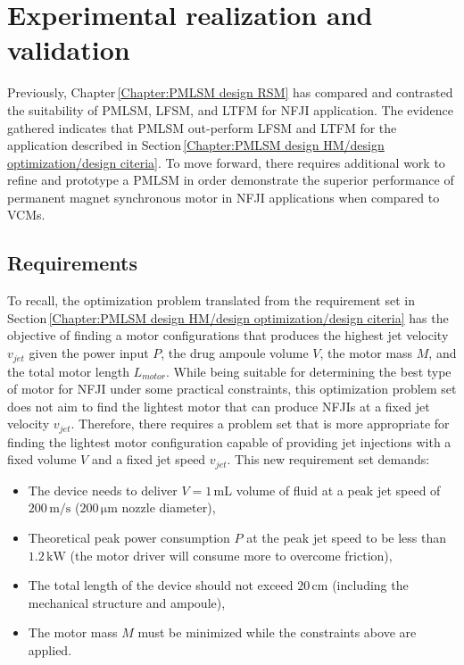 \chapter{Experimental realization and validation}   \label{Chapter:experiment}
    
    
    Previously, Chapter\,\ref{Chapter:PMLSM design RSM} has compared and contrasted the suitability of \acf{PMLSM}, \acf{LFSM}, and \acf{LTFM} for \acf{NFJI} application. The evidence gathered indicates that \acs{PMLSM} out-perform \acs{LFSM} and \acs{LTFM} for the application described in Section\,\ref{Chapter:PMLSM design HM/design optimization/design citeria}. To move forward, there requires additional work to refine and prototype a \acs{PMLSM} in order demonstrate the superior performance of permanent magnet synchronous motor in \acs{NFJI} applications when compared to \acfp{VCM}.  
    
    
\section{Requirements}                              \label{Chapter:experiment/requirements}
    
    To recall, the optimization problem translated from the requirement set in Section\,\ref{Chapter:PMLSM design HM/design optimization/design citeria} has the objective of finding a motor configurations that produces the highest jet velocity $v_{jet}$ given the power input $P$, the drug ampoule volume $V$, the motor mass $M$, and the total motor length $L_{motor}$. While being suitable for determining the best type of motor for \acs{NFJI} under some practical constraints, this optimization problem set does not aim to find the lightest motor that can produce \acsp{NFJI} at a fixed jet velocity $v_{jet}$. Therefore, there requires a problem set that is more appropriate for finding the lightest motor configuration capable of providing jet injections with a fixed volume $V$ and a fixed jet speed $v_{jet}$. This new requirement set demands:
    
    
    \begin{itemize}
        \item The device needs to deliver $V = 1\,\mathrm{mL}$ volume of fluid at a peak jet speed of $200\,\mathrm m/\mathrm s$ ($200\,\mathrm{\mu m}$ nozzle diameter),
        \item Theoretical peak power consumption $P$ at the peak jet speed to be less than $1.2\,\mathrm{kW}$ (the motor driver will consume more to overcome friction),
        \item The total length of the device should not exceed $20\,\mathrm{cm}$  (including the mechanical structure and ampoule),
        \item The motor mass $M$ must be minimized while the constraints above are applied.
    \end{itemize}
    
